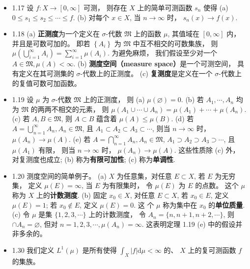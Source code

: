 \begin{itemize}
\item 1.17 设 $f:X \rightarrow[0, \infty]$ 可测， 则存在 $X$ 上的简单可测函数 $s_{n}$ 使得 (a) $0 \leqslant s_{1} \leqslant s_{2} \leqslant \cdots \leqslant f$. (b) 对每个 $x \in X$, 当 $n \rightarrow \infty$ 时， $s_{n}(x) \rightarrow f(x)$.

\item 1.18 (a) \textbf{正测度}为一个定义在 $\sigma$-代数 $\mathfrak{M}$ 上的函数 $\mu$, 其值域在 $[0, \infty]$ 内， 并且是可数可加的。 即若 $\left\{A_{i}\right\}$ 为 $\mathfrak{M}$ 中互不相交的可数集族， 则 $\mu\left(\bigcup_{i=1}^{\infty} A_{i}\right)=\sum_{i=1}^{\infty} \mu\left(A_{i}\right)$. 为避免麻烦， 我们假设至少对一个 $A \in \mathfrak{M}, \mu(A)<\infty$.
(b) \textbf{测度空间（measure space）}是一个可测空间， 具有定义在其可测集的 $\sigma$-代数上的正测度。
(c) \textbf{复测度}是定义在一个 $\sigma$-代数上的复值可数可加函数。

\item 1.19 设 $\mu$ 为 $\sigma$-代数 $\mathfrak{M}$ 上的正测度， 则
(a) $\mu(\varnothing)=0$.
(b) 若 $A_{1}, \cdots, A_{n}$ 均为 $\mathfrak{M}$ 的两两不相交的元素， 则
$\mu\left(A_{1} \cup \cdots \cup A_{n}\right)=\mu\left(A_{1}\right)+\cdots+\mu\left(A_{n}\right) .$
(c) 若 $A, B \in \mathfrak{M}$, 则 $A \subset B$ 蕴含着 $\mu(A) \leqslant \mu(B)$.
(d) 若 $A=\bigcup_{n=1}^{\infty} A_{n}, A_{n} \in \mathfrak{M}$, 且 $A_{1} \subset A_{2} \subset A_{3} \subset \cdots$, 则当 $n \rightarrow \infty$ 时， $\mu\left(A_{n}\right) \rightarrow \mu(A)$.
(e) 若 $A=\bigcap_{n=1}^{\infty} A_{n}, A_{n} \in \mathfrak{M}$, $A_{1} \supset A_{2} \supset A_{3} \supset \cdots$, 且 $\mu\left(A_{1}\right)$ 有限， 则当 $n \rightarrow \infty$ 时， $\mu\left(A_{n}\right) \rightarrow \mu(A)$.
这些性质除 (c) 外， 对复测度也成立; (b) 称为\textbf{有限可加性}; (c) 称为\textbf{单调性}.

\item 1.20 测度空间的简单例子。
(a) $X$ 为任意集，对任意 $E \subset X$, 若 $E$ 为无穷集， 定义 $\mu(E)=\infty$, 当 $E$ 为有限集时， 令 $\mu(E)$ 为 $E$ 的点数。 这个 $\mu$ 称为 $X$ 上的\textbf{计数测度}.
(b) 固定 $x_{0} \in X$, 对任意 $E \subset X$, 若 $x_{0} \in E$, 定义 $\mu(E)=1$; 若 $x_{0} \notin E$, 定义 $\mu(E)=0$. 这 个 $\mu$ 称为集中在 $x_{0}$ 的\textbf{单位质量}.
(c) 令 $\mu$ 是集 $\{1,2,3, \cdots\}$ 上的计数测度， 令 $A_{n}=\{n, n+1, n+2, \cdots\}$, 则 $\cap A_{n}=\varnothing$, 但对 $n=1,2,3, \cdots, \mu\left(A_{n}\right)=\infty$. 这表明定理 1.19 (e) 中的假设并非多余的。

\item 1.30 我们定义 $L^{1}(\mu)$ 是所有使得 $\int_{X}|f| \mathrm{d} \mu<\infty$ 的、 $X$ 上的复可测函数 $f$ 的集族。


\end{itemize}
